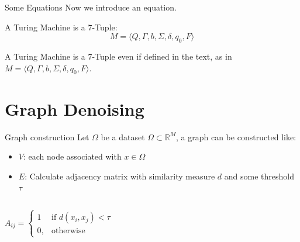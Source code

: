 \documentclass[aspectratio=169]{beamer}
\begin{document}
\begin{frame}[c]{Some Equations}
Now we introduce an equation.
\begin{theorem}
A Turing Machine is a 7-Tuple:
\begin{equation}
    M = \langle Q, \Gamma, b, \Sigma, \delta, q_0, F \rangle
\end{equation}
\end{theorem}
A Turing Machine is a 7-Tuple even if defined in the text, as in $M = \langle Q, \Gamma, b, \Sigma, \delta, q_0, F \rangle$.
\end{frame}


\section{Graph Denoising}

\begin{frame}{Graph construction}
    Let $\Omega$ be a dataset $\Omega \subset \mathbb{R}^M$, a graph can be constructed like:
    \begin{itemize}
        \item $V$: each node associated with $x \in \Omega$
        \item $E$: Calculate adjacency matrix with similarity measure $d$ and some threshold $\tau$
     \end{itemize}

    \begin{columns}
            \begin{definition}
                \begin{equation}
                    \label{eq:graphConstruction}
                    A_{ij} =    
                    \begin{cases}
                        1  & \text{if } d(x_i, x_j) < \tau\\
                        0, & \text{otherwise}
                    \end{cases}
                \end{equation}
            \end{definition}
    \end{columns}
\end{frame}
\end{document}
